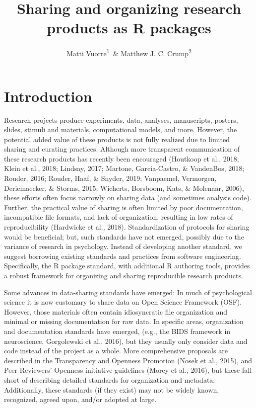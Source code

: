 \documentclass[
  english,
  jou,floatsintext]{apa6}
\author{Matti Vuorre\textsuperscript{1}\ \& Matthew J. C. Crump\textsuperscript{2}}
\affiliation{
\vspace{0.5cm}
\textsuperscript{1} Department of Psychology, Columbia University, New York, USA\\\textsuperscript{2} Department of Psychology, Brooklyn College of CUNY, New York USA}
\title{Sharing and organizing research products as R packages}
\date{}
\begin{document}
\maketitle

\hypertarget{introduction}{%
\section{Introduction}\label{introduction}}

Research projects produce experiments, data, analyses, manuscripts, posters, slides, stimuli and materials, computational models, and more. However, the potential added value of these products is not fully realized due to limited sharing and curating practices. Although more transparent communication of these research products has recently been encouraged (Houtkoop et al., 2018; Klein et al., 2018; Lindsay, 2017; Martone, Garcia-Castro, \& VandenBos, 2018; Rouder, 2016; Rouder, Haaf, \& Snyder, 2019; Vanpaemel, Vermorgen, Deriemaecker, \& Storms, 2015; Wicherts, Borsboom, Kats, \& Molenaar, 2006), these efforts often focus narrowly on sharing data (and sometimes analysis code). Further, the practical value of sharing is often limited by poor documentation, incompatible file formats, and lack of organization, resulting in low rates of reproducibility (Hardwicke et al., 2018). Standardization of protocols for sharing would be beneficial; but, such standards have not emerged, possibly due to the variance of research in psychology. Instead of developing another standard, we suggest borrowing existing standards and practices from software engineering. Specifically, the R package standard, with additional R authoring tools, provides a robust framework for organizing and sharing reproducible research products.

Some advances in data-sharing standards have emerged: In much of psychological science it is now customary to share data on Open Science Framework (OSF). However, those materials often contain idiosyncratic file organization and minimal or missing documentation for raw data. In specific areas, organization and documentation standards have emerged, (e.g., the BIDS framework in neuroscience, Gorgolewski et al., 2016), but they usually only consider data and code instead of the project as a whole. More comprehensive proposals are described in the Transparency and Openness Promotion (Nosek et al., 2015), and Peer Reviewers' Openness initiative guidelines (Morey et al., 2016), but these fall short of describing detailed standards for organization and metadata. Additionally, these standards (if they exist) may not be widely known, recognized, agreed upon, and/or adopted at large.
\end{document}
